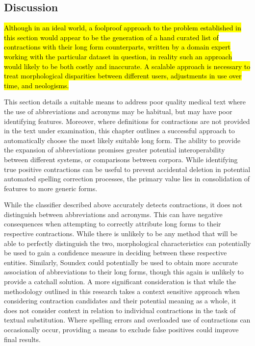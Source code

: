 \subsection{Discussion}

\hl{Although in an ideal world, a foolproof approach to the problem established in this section would appear to be the generation of a hand curated list of contractions with their long form counterparts, written by a domain expert working with the particular dataset in question, in reality such an approach would likely to be both costly and inaccurate. A scalable approach is necessary to treat morphological disparities between different users, adjustments in use over time, and neologisms.}      

This section details a suitable means to address poor quality medical text where the use of abbreviations and acronyms may be habitual, but may have poor identifying features. Moreover, where definitions for contractions are not provided in the text under examination, this chapter outlines a successful approach to automatically choose the most likely suitable long form. The ability to provide the expansion of abbreviations promises greater potential interoperability between different systems, or comparisons between corpora. While identifying true positive contractions can be useful to prevent accidental deletion in potential automated spelling correction processes, the primary value lies in consolidation of features to more generic forms.

While the classifier described above accurately detects contractions, it does not distinguish between abbreviations and acronyms. This can have negative consequences when attempting to correctly attribute long forms to their respective contractions. While there is unlikely to be any method that will be able to perfectly distinguish the two, morphological characteristics can potentially be used to gain a confidence measure in deciding between these respective entities. Similarly, Soundex could potentially be used to obtain more accurate association of abbreviations to their long forms, though this again is unlikely to provide a catchall solution. A more significant consideration is that while the methodology outlined in this research takes a context sensitive approach when considering contraction candidates and their potential meaning as a whole, it does not consider context in relation to individual contractions in the task of textual substitution. Where spelling errors and overloaded use of contractions can occasionally occur, providing a means to exclude false positives could improve final results.

